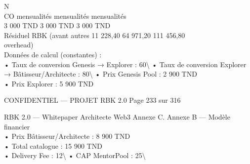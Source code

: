 \vspace{0.5em}
\vspace{0.5em}
\vspace{0.5em}
N\\
CO                  mensualités       mensualités   mensualités\\
3 000 TND         3 000 TND     3 000 TND\\
Résiduel RBK (avant autres        11 228,40         64 971,20     111 456,80\\
overhead)\\
\vspace{0.5em}
\vspace{0.5em}
\vspace{0.5em}
Données de calcul (constantes) :\\
\vspace{0.5em}
• Taux de conversion Genesis → Explorer : 60\textbackslash{}%
\vspace{0.5em}
• Taux de conversion Explorer → Bâtisseur/Architecte : 80\textbackslash{}%
\vspace{0.5em}
• Prix Genesis Pool : 2 900 TND\\
\vspace{0.5em}
• Prix Explorer : 5 900 TND\\
\vspace{0.5em}
\vspace{0.5em}
\begin{confidential}CONFIDENTIEL — PROJET RBK 2.0                                          Page 233 sur 316\end{confidential}
RBK 2.0 — Whitepaper Architecte Web3                                                                                    Annexe C. Annexe B — Modèle financier\\
\vspace{0.5em}
\vspace{0.5em}
• Prix Bâtisseur/Architecte : 8 900 TND\\
\vspace{0.5em}
• Total catalogue : 15 900 TND\\
\vspace{0.5em}
• Delivery Fee : 12\textbackslash{}%
\vspace{0.5em}
• CAP MentorPool : 25\textbackslash{}%
\vspace{0.5em}

